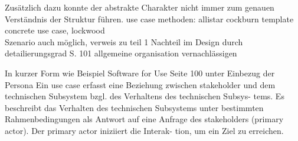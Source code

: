 Zusätzlich dazu konnte der abstrakte Charakter nicht immer zum genauen Verständnis der Struktur führen.
use case methoden: allistar cockburn template \\
concrete use case, lockwood\\

Szenario auch möglich, verweis zu teil 1
Nachteil im Design durch detailierungsgrad S. 101 allgemeine organisation vernachlässigen

In kurzer Form wie Beispiel Software for Use Seite 100 unter Einbezug der Persona
Ein use case erfasst eine Beziehung zwischen stakeholder und dem technischen Subsystem bzgl. des Verhaltens des technischen Subsys- tems. Es beschreibt das Verhalten des technischen Subsystems unter bestimmten Rahmenbedingungen als Antwort auf eine Anfrage des stakeholders (primary actor). Der primary actor iniziiert die Interak- tion, um ein Ziel zu erreichen.


